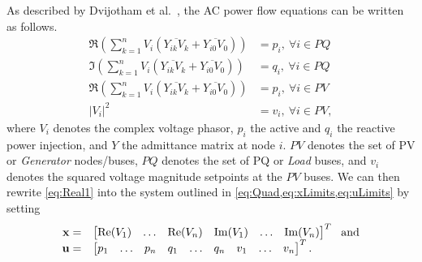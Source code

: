 As described by Dvijotham et al.~\cite{DjTuritsyn}, the AC power flow equations can be written as follows.
\begin{equation}\label{eq:Real1}
	\begin{array}{rl}
	\Re\left(\sum\limits_{k=1}^n V_i\left(\overline{Y_{ik}V_k} + \overline{Y_{i0}V_0}\right)\right) &= p_i, \ \forall i\in PQ \\
	
	\Im\left(\sum\limits_{k=1}^n V_i\left(\overline{Y_{ik}V_k} + \overline{Y_{i0}V_0}\right)\right) &= q_i, \ \forall i\in PQ \\
	
	\Re\left(\sum\limits_{k=1}^n V_i\left(\overline{Y_{ik}V_k} + \overline{Y_{i0}V_0}\right)\right) &= p_i, \ \forall i\in PV \\ 
	
	|V_i|^2 &= v_i, \  \forall i \in PV,
	\end{array}
\end{equation}
%
where $V_i$ denotes the complex voltage phasor, $p_i$ the active and $q_i$ the reactive power injection, and $Y$ the admittance matrix at node $i$.
$PV$ denotes the set of PV or \emph{Generator} nodes/buses, $PQ$ denotes the set of PQ or \emph{Load} buses, and $v_i$ denotes the squared voltage magnitude setpoints at the $PV$ buses.
We can then rewrite \cref{eq:Real1} into the system outlined in \cref{eq:Quad,eq:xLimits,eq:uLimits} by setting
\[
\begin{array}{rl}
\mathbf{x}= & \begin{bmatrix} \operatorname{Re}(V_1) & \dots & \operatorname{Re}(V_n) & \operatorname{Im}(V_1) & \dots  &  \operatorname{Im}(V_n) \end{bmatrix}^T ~~\mbox{and} \\
\mathbf{u}=& \begin{bmatrix} p_1 &  \dots &  p_n &  q_1 &  \dots &  q_n &  v_1 &  \dots &  v_n \end{bmatrix}^T.
\end{array}
\]



